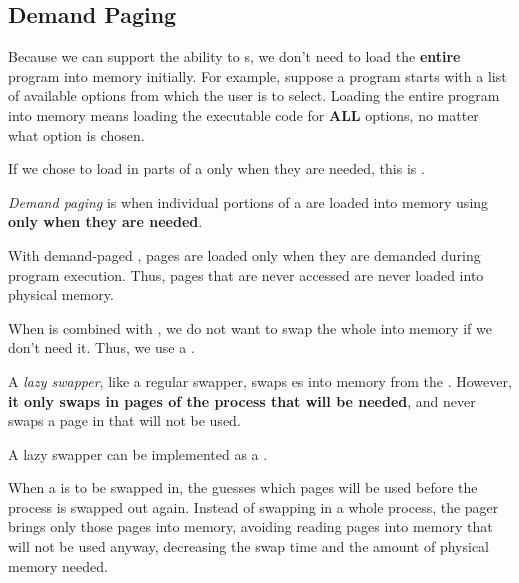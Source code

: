 \subsection{Demand Paging}\label{subsec:Demand_Paging}
Because we can support the ability to  s, we don't need to load the \textbf{entire} program into memory initially.
For example, suppose a program starts with a list of available options from which the user is to select.
Loading the entire program into memory means loading the executable code for \textbf{ALL} options, no matter what option is chosen.

If we chose to load in parts of a  only when they are needed, this is .

\begin{definition}\label{def:Demand_Paging}
  \emph{Demand paging} is when individual portions of a  are loaded into memory using  \textbf{only when they are needed}.

  With demand-paged , pages are loaded only when they are demanded during program execution.
  Thus, pages that are never accessed are never loaded into physical memory.
\end{definition}

When  is combined with , we do not want to swap the whole  into memory if we don't need it.
Thus, we use a .

\begin{definition}\label{def:Lazy_Swapper}
  A \emph{lazy swapper}, like a regular swapper, swaps es into memory from the .
  However, \textbf{it only swaps in pages of the process that will be needed}, and never swaps a page in that will not be used.

  A lazy swapper can be implemented as a .
\end{definition}

When a  is to be swapped in, the  guesses which pages will be used before the process is swapped out again.
Instead of swapping in a whole process, the pager brings only those pages into memory, avoiding reading pages into memory that will not be used anyway, decreasing the swap time and the amount of physical memory needed.

